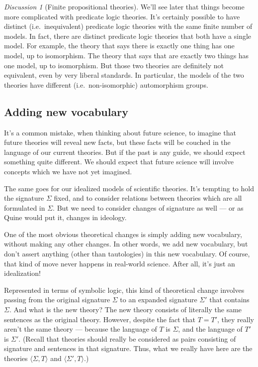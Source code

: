\documentclass[11pt]{article}
\theoremstyle{definition}
\theoremstyle{remark}
\newtheorem*{disc}{Discussion}
\begin{document}
\begin{disc}[Finite propositional theories]
  We'll see later that things become more complicated with predicate
  logic theories.  It's certainly possible to have distinct (i.e.\
  inequivalent) predicate logic theories with the same finite number
  of models.  In fact, there are distinct predicate logic theories
  that both have a single model.  For example, the theory that says
  there is exactly one thing has one model, up to isomorphism.  The
  theory that says that are exactly two things has one model, up to
  isomorphism.  But those two theories are definitely not equivalent,
  even by very liberal standards.  In particular, the models of the
  two theories have different (i.e.\ non-isomorphic) automorphism
  groups.
\end{disc}






\subsection{Adding new vocabulary}

It's a common mistake, when thinking about future science, to imagine
that future theories will reveal new facts, but these facts will be
couched in the language of our current theories.  But if the past is
any guide, we should expect something quite different.  We should
expect that future science will involve concepts which we have not yet
imagined.

The same goes for our idealized models of scientific theories.  It's
tempting to hold the signature $\Sigma$ fixed, and to consider
relations between theories which are all formulated in $\Sigma$.  But
we need to consider changes of signature as well --- or as Quine would
put it, changes in ideology.

One of the most obvious theoretical changes is simply adding new
vocabulary, without making any other changes.  In other words, we add
new vocabulary, but don't assert anything (other than tautologies) in
this new vocabulary.  Of course, that kind of move never happens in
real-world science.  After all, it's just an idealization!

Represented in terms of symbolic logic, this kind of theoretical
change involves passing from the original signature $\Sigma$ to an
expanded signature $\Sigma '$ that contains $\Sigma$.  And what is the
new theory?  The new theory consists of literally the same sentences
as the original theory.  However, despite the fact that $T=T'$, they
really aren't the same theory --- because the language of $T$ is
$\Sigma$, and the language of $T'$ is $\Sigma '$.  (Recall that
theories should really be considered as pairs consisting of signature
and sentences in that signature.  Thus, what we really have here are
the theories $\langle \Sigma ,T\rangle$ and $\langle \Sigma
',T\rangle$.)
\end{document}
